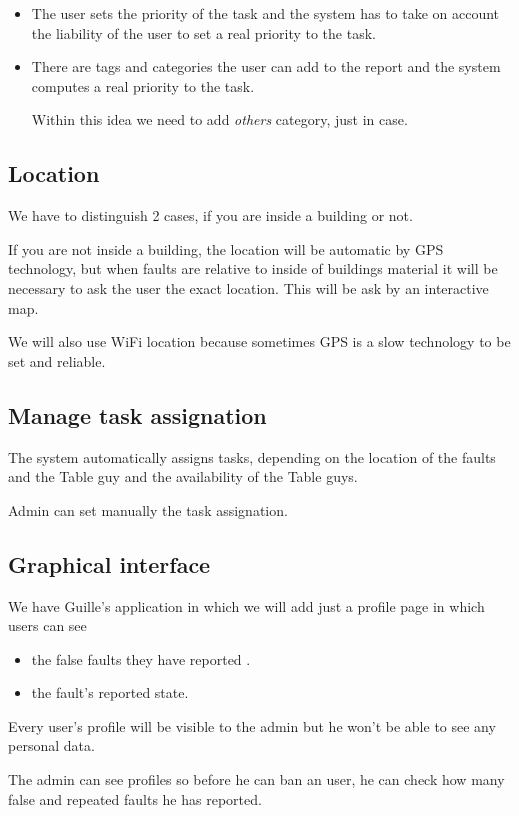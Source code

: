 \documentclass{article}
\newcommand{\tbg}{Table guy\xspace}
\newcommand{\tbgs}{Table guys\xspace}
\begin{document}
\begin{itemize}
\item The user sets the priority of the task and the system has to take on account the liability of the user to set a real priority to the task.

\item There are tags and categories the user can add to the report and the system computes a real priority to the task.

Within this idea we need to add \textit{others} category, just in case.
\end{itemize}

\subsection{Location}

We have to distinguish 2 cases, if you are inside a building or not.

If you are not inside a building, the location will be automatic by GPS technology, but when faults are relative to inside of buildings material it will be necessary to ask the user the exact location. This will be ask by an interactive map.


We will also use WiFi location because sometimes GPS is a slow technology to be set and reliable.

\subsection{Manage task assignation}
The system automatically assigns tasks, depending on the location of the faults and the \tbg and the availability of the \tbgs.

Admin can set manually the task assignation.

\subsection{Graphical interface}
We have Guille's application in which we will add just a profile page in which users can see
\begin{itemize}
\item the false faults they have reported .
\item the fault's reported state.
\end{itemize}

Every user's profile will be visible to the admin but he won't be able to see any personal data.

The admin can see profiles so before he can ban an user, he can check how many false and repeated faults he has reported.
\end{document}
